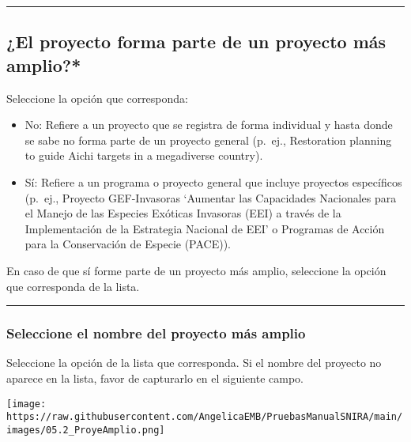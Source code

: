 \documentclass[
]{book}
\begin{document}
\begin{center}\rule{0.5\linewidth}{0.5pt}\end{center}

\hypertarget{el-proyecto-forma-parte-de-un-proyecto-muxe1s-amplio}{%
\subsection*{\texorpdfstring{{¿El proyecto forma parte de un proyecto más amplio?*}}{¿El proyecto forma parte de un proyecto más amplio?*}}\label{el-proyecto-forma-parte-de-un-proyecto-muxe1s-amplio}}

Seleccione la opción que corresponda:

\begin{itemize}
\item
  No: Refiere a un proyecto que se registra de forma individual y hasta donde se sabe no forma parte de un proyecto general (p.~ej., Restoration planning to guide Aichi targets in a megadiverse country).
\item
  Sí: Refiere a un programa o proyecto general que incluye proyectos específicos (p.~ej., Proyecto GEF-Invasoras `Aumentar las Capacidades Nacionales para el Manejo de las Especies Exóticas Invasoras (EEI) a través de la Implementación de la Estrategia Nacional de EEI' o Programas de Acción para la Conservación de Especie (PACE)).
\end{itemize}

En caso de que sí forme parte de un proyecto más amplio, seleccione la opción que corresponda de la lista.

\begin{center}\rule{0.5\linewidth}{0.5pt}\end{center}

\hypertarget{seleccione-el-nombre-del-proyecto-muxe1s-amplio}{%
\subsubsection*{Seleccione el nombre del proyecto más amplio}\label{seleccione-el-nombre-del-proyecto-muxe1s-amplio}}

Seleccione la opción de la lista que corresponda. Si el nombre del proyecto no aparece en la lista, favor de capturarlo en el siguiente campo.

\texttt{[image: https://raw.githubusercontent.com/AngelicaEMB/PruebasManualSNIRA/main/images/05.2\_ProyeAmplio.png]}
\end{document}
